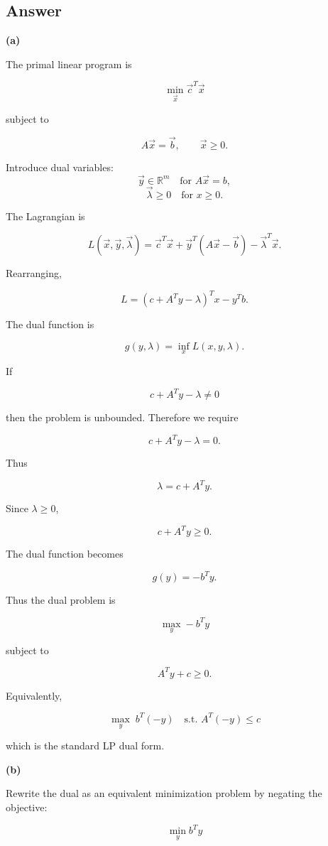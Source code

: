 \documentclass[
	12pt,
]{fphw}
\begin{document}
\subsection*{Answer}

\textbf{(a)}

The primal linear program is

\[
\min_{\vec{x}} \vec{c}^T\vec{x}
\]

subject to

\[
A\vec{x} = \vec{b}, \qquad \vec{x} \ge 0.
\]

Introduce dual variables:
\[
\vec{y} \in \mathbb{R}^m \quad \text{for } A\vec{x}=b,
\]
\[
\vec{\lambda} \ge 0 \quad \text{for } x \ge 0.
\]

The Lagrangian is

\[
L(\vec{x},\vec{y},\vec{\lambda})
=
\vec{c}^T\vec{x}
+
\vec{y}^T(A\vec{x}-\vec{b})
-
\vec{\lambda}^T\vec{x}.
\]

Rearranging,

\[
L
=
(c + A^T y - \lambda)^T x - y^T b.
\]

The dual function is

\[
g(y,\lambda) = \inf_x L(x,y,\lambda).
\]

If

\[
c + A^T y - \lambda \neq 0
\]

then the problem is unbounded. Therefore we require

\[
c + A^T y - \lambda = 0.
\]

Thus

\[
\lambda = c + A^T y.
\]

Since $\lambda \ge 0$,

\[
c + A^T y \ge 0.
\]

The dual function becomes

\[
g(y) = -b^T y.
\]

Thus the dual problem is

\[
\max_y -b^T y
\]

subject to

\[
A^T y + c \ge 0.
\]

Equivalently,

\[
\max_y \; b^T(-y)
\quad
\text{s.t. } A^T(-y) \le c
\]

which is the standard LP dual form.

\textbf{(b)}

Rewrite the dual as an equivalent minimization problem by negating the objective:

\[
\min_y b^T y
\]
\end{document}
